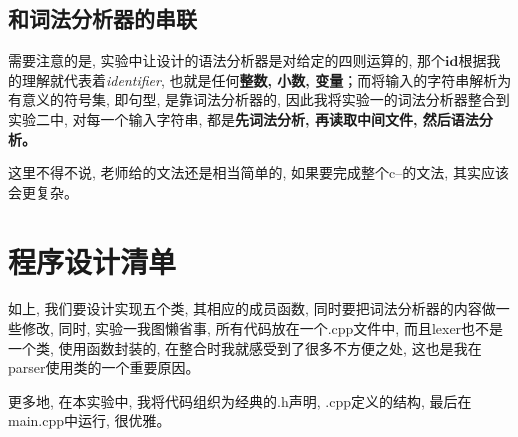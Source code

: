 \documentclass{zpt}
\begin{document}
    \subsection{和词法分析器的串联}
    需要注意的是, 实验中让设计的语法分析器是对给定的四则运算的, 那个$\mathbf{id}$根据我的理解就代表着\emph{identifier}, 也就是任何\textbf{整数, 小数, 变量}；而将输入的字符串解析为有意义的符号集, 即句型, 是靠词法分析器的, 因此我将实验一的词法分析器整合到实验二中, 对每一个输入字符串, 都是\textbf{先词法分析, 再读取中间文件, 然后语法分析。}\par
    这里不得不说, 老师给的文法还是相当简单的, 如果要完成整个c--的文法, 其实应该会更复杂。\par


    \section{程序设计清单}
    如上, 我们要设计实现五个类, 其相应的成员函数, 同时要把词法分析器的内容做一些修改, 同时, 实验一我图懒省事, 所有代码放在一个.cpp文件中, 而且lexer也不是一个类, 使用函数封装的, 在整合时我就感受到了很多不方便之处, 这也是我在parser使用类的一个重要原因。\par
    更多地, 在本实验中, 我将代码组织为经典的.h声明, .cpp定义的结构, 最后在main.cpp中运行, 很优雅。
\end{document}
